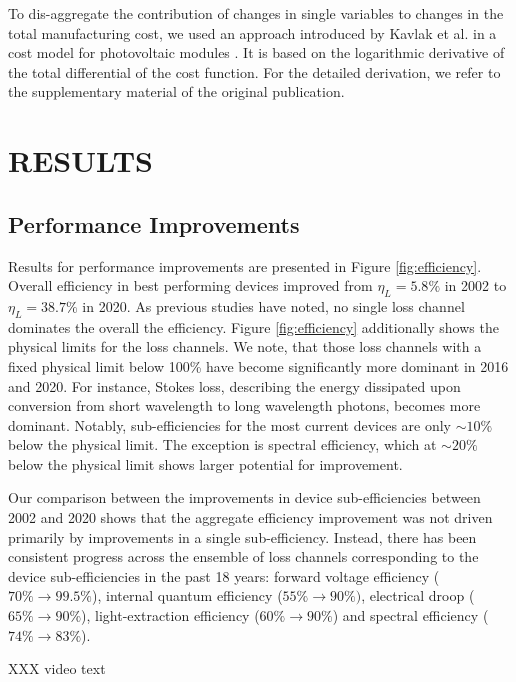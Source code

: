 \documentclass[a4paper,nocompress]{spie}  %
\begin{document}
        To dis-aggregate the contribution of changes in single variables to changes in the total manufacturing cost, we used an approach introduced by Kavlak et al. in a cost model for photovoltaic modules \cite{kavlak2018evaluating}. It is based on the logarithmic derivative of the total differential of the cost function.  For the detailed derivation, we refer to the supplementary material of the original publication.

\section{RESULTS}

\subsection{Performance Improvements}

     Results for performance improvements are presented in Figure \ref{fig:efficiency}. Overall efficiency in best performing devices improved from $\eta_L=5.8\%$ in 2002 to $\eta_L = 38.7\%$ in 2020. As previous studies have noted, no single loss channel dominates the overall the efficiency\cite{tsao2010solid}. Figure \ref{fig:efficiency} additionally shows the physical limits for the loss channels. We note, that those loss channels with a fixed physical limit below 100\% have become significantly more dominant in 2016 and 2020. For instance, Stokes loss, describing the energy dissipated upon conversion from short wavelength to long wavelength photons, becomes more dominant. Notably, sub-efficiencies for the most current devices are only $\sim10\%$ below the physical limit. The exception is spectral efficiency, which at $\sim20\%$ below the physical limit shows larger potential for improvement.
     
     Our comparison between the improvements in device sub-efficiencies between 2002 and 2020 shows that the aggregate efficiency improvement was not driven primarily by improvements in a single sub-efficiency. Instead, there has been consistent progress across the ensemble of loss channels corresponding to the device sub-efficiencies in the past 18 years: forward voltage efficiency ($70\%\rightarrow99.5\%$), internal quantum efficiency ($55\%\rightarrow90\%)$, electrical droop ($65\%\rightarrow90\%$), light-extraction efficiency ($60\%\rightarrow90\%$) and spectral efficiency ($74\% \rightarrow83\%$).
     
     XXX video text
     
\end{document}
